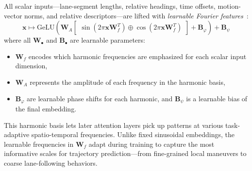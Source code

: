 All scalar inputs—lane-segment lengths, relative headings, time offsets, motion-vector norms, and relative descriptors—are lifted with \emph{learnable Fourier features}~\cite{li2021llearnableFourier}:
\begin{equation}
  \label{eq:learnable_fourier_embedding}
\mathbf{x} \mapsto \text{GeLU}\left(\mathbf{W}_A \begin{bmatrix} \sin(2\pi \mathbf{x} \mathbf{W}_f^T) \oplus \cos(2\pi \mathbf{x} \mathbf{W}_f^T) \end{bmatrix} + \mathbf{B}_\varphi\right) + \mathbf{B}_\psi
\end{equation}
where all \(\mathbf{W}_\bullet\) and \(\mathbf{B}_\bullet\) are learnable parameters:
\begin{itemize}[leftmargin=*]
    \item \(\mathbf{W}_f\) encodes which harmonic frequencies are emphasized for each scalar input dimension,
    \item \(\mathbf{W}_A\) represents the amplitude of each frequency in the harmonic basis,
    \item \(\mathbf{B}_\varphi\) are learnable phase shifts for each harmonic, and \(\mathbf{B}_\psi \) is a learnable bias of the final embedding.
\end{itemize}
This harmonic basis lets later attention layers pick up patterns at various task-adaptive spatio-temporal frequencies. Unlike fixed sinusoidal embeddings, the learnable frequencies in \(\mathbf{W}_f\) adapt during training to capture the most informative scales for trajectory prediction—from fine-grained local maneuvers to coarse lane-following behaviors.



